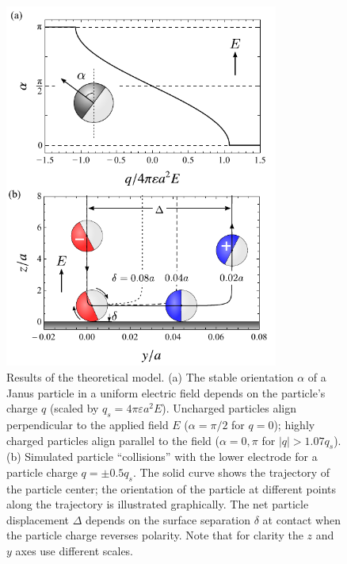 \begin{figure}[p]
\centering
\includegraphics[width=9cm]{figures/2_4.pdf}
\caption{Results of the theoretical model. (a) The stable orientation $\alpha$ of a Janus particle in a uniform electric field depends on the particle's charge $q$ (scaled by $q_s = 4\pi\varepsilon a^2 E$). Uncharged particles align perpendicular to the applied field $E$ ($\alpha=\pi/2$ for $q=0$); highly charged particles align parallel to the field ($\alpha=0,\pi$ for $|q|>1.07 q_s$). (b) Simulated particle ``collisions'' with the lower electrode for a particle charge $q=\pm0.5q_s$. The solid curve shows the trajectory of the particle center; the orientation of the particle at different points along the trajectory is illustrated graphically. The net particle displacement $\Delta$ depends on the surface separation $\delta$ at contact when the particle charge reverses polarity. Note that for clarity the $z$ and $y$ axes use different scales.}
\label{fig:4}
\end{figure}

